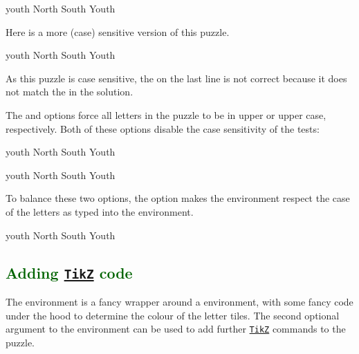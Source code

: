 \documentclass[svgnames]{report}
\newcommand\ctan[1]{\href{https://www.ctan.org/pkg/#1}{\texttt{#1}}}
\newcommand\Section[1]{\subsection{\textcolor{DarkGreen}{#1}}}
\begin{document}
  \begin{example}
    \begin{wordle}{youth}
      North
      South
      Youth
    \end{wordle}
  \end{example}

  Here is a more (case) sensitive version of this puzzle.

  \begin{example}
    \begin{wordle}[case sensitive=true]{youth}
      North
      South
      Youth
    \end{wordle}
  \end{example}

  As this puzzle is case sensitive, the  on the last line
  is not correct because it does not match the  in the
  solution.

  The  and  options force all
  letters in the puzzle to be in upper or upper case, respectively. Both
  of these options disable the case sensitivity of the tests:

  \begin{example}
    \begin{wordle}{youth}
      North
      South
      Youth
    \end{wordle}
  \end{example}

  \begin{example}
    \begin{wordle}{youth}
      North
      South
      Youth
    \end{wordle}
  \end{example}

  To balance these two options, the  option makes
  the  environment respect the case of the letters as
  typed into the environment.

  \begin{example}
    \begin{wordle}{youth}
      North
      South
      Youth
    \end{wordle}
  \end{example}


  \Section{Adding \ctan{TikZ} code}

  The  environment is a fancy wrapper around a
   environment, with some fancy code under the hood
  to determine the colour of the letter tiles. The second optional
  argument to the  environment can be used to add
  further \ctan{TikZ} commands to the puzzle.
\end{document}
